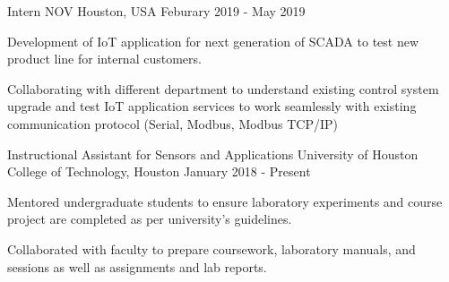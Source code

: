 \begin{cventries}
	\cventry
	{Intern} %
	{NOV} %
	{Houston, USA} %
	{Feburary 2019 - May 2019} %
	{ %
		\begin{cvitems}
			\item { Development of IoT application for next generation of SCADA to test new product line for internal customers.	} 
			\item { Collaborating with different department to understand existing control system upgrade and test IoT application services to work seamlessly with existing communication protocol (Serial, Modbus,  Modbus TCP/IP) }
		\end{cvitems}
	}

\end{cventries}
\begin{cventries}
	\cventry
	{Instructional Assistant for Sensors and Applications} %
	{University of Houston} %
	{College of Technology, Houston} %
	{January 2018 - Present} %
	{ %
		\begin{cvitems}
			\item {Mentored undergraduate students to ensure laboratory experiments and course project are completed as per university's guidelines.} 
			\item {Collaborated with faculty to prepare coursework, laboratory manuals, and sessions as well as assignments and lab reports. }
		\end{cvitems}
	}

\end{cventries}

